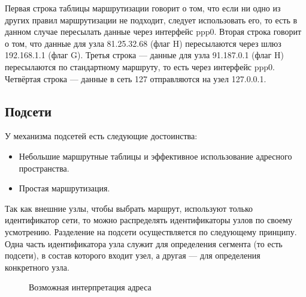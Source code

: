 Первая строка таблицы маршрутизации говорит о том, что если ни одно из других правил маршрутизации не подходит, следует использовать его, то есть в данном случае пересылать данные через интерфейс ppp0. Вторая строка говорит о том, что данные для узла 81.25.32.68 (флаг H) пересылаются через шлюз 192.168.1.1 (флаг G). Третья строка — данные для узла 91.187.0.1 (флаг H) пересылаются по стандартному маршруту, то есть через интерфейс ppp0. Четвёртая строка — данные в сеть 127 отправляются на узел 127.0.0.1.

\subsection{Подсети}
У механизма подсетей есть следующие достоинства:
\begin{itemize}
  \item Небольшие маршрутные таблицы и эффективное использование адресного пространства.
  \item Простая маршрутизация.
\end{itemize}

Так как внешние узлы, чтобы выбрать маршрут, используют только идентификатор сети, то можно распределять идентификаторы узлов по своему усмотрению. Разделение на подсети осуществляется по следующему принципу. Одна часть идентификатора узла служит для определения сегмента (то есть подсети), в состав которого входит узел, а другая --- для определения конкретного узла.

\noindent
\begin{figure}[h!]
  \centering
  \caption{Возможная интерпретация адреса}
\end{figure}

